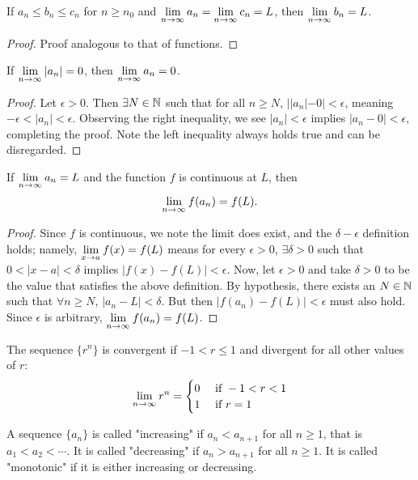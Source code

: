 \documentclass[a4paper,8pt]{article}
\begin{document}
\begin{outline}
    If \(a_n \leq b_n \leq c_n\) for \(n \geq n_0\) and \(\lim\limits_{n\rightarrow \infty^{}}a_n = \lim\limits_{n\rightarrow \infty^{}} c_n = L\), then \(\lim\limits_{n\rightarrow \infty^{}}b_n = L\).

    \begin{proof}
      Proof analogous to that of functions.
    \end{proof}

    If \(\lim\limits_{n\rightarrow \infty^{}}|a_n| = 0\), then \(\lim\limits_{n\rightarrow \infty^{}} a_n = 0\).

    \begin{proof}
      Let \(\epsilon > 0\). Then \(\exists N \in \mathbb{N}\) such that for all \(n \geq N\), \(||a_n|-0| < \epsilon\), meaning \(-\epsilon < |a_n| < \epsilon\).
      Observing the right inequality, we see \(|a_n| < \epsilon\) implies \(|a_n-0| < \epsilon\), completing the proof. Note the left inequality always
      holds true and can be disregarded.
    \end{proof}

    If \(\lim\limits_{n\rightarrow \infty^{}} a_n = L\) and the function \(f\) is continuous at \(L\), then \[ \lim\limits_{n\rightarrow \infty^{}} f(a_n) = f(L)\text{.} \]

    \begin{proof}
      Since \(f\) is continuous, we note the limit does exist, and the \(\delta-\epsilon\) definition holds; namely, \(\lim\limits_{x\rightarrow a^{}} f(x) = f(L)\)
      means for every \(\epsilon > 0\), \(\exists \delta > 0\) such that \(0 < |x - a| < \delta\) implies \(|f(x)-f(L)| < \epsilon\). Now, let
      \(\epsilon > 0\) and take \(\delta > 0\) to be the value that satisfies the above definition. By hypothesis, there exists an \(N \in \mathbb{N}\) such
      that \(\forall n \geq N\), \(|a_n - L| < \delta\). But then \(|f(a_n) - f(L)| < \epsilon\) must also hold. Since \(\epsilon\) is arbitrary,
      \(\lim\limits_{n\rightarrow \infty^{}} f(a_n) = f(L)\).
    \end{proof}

    The sequence \(\{r^n\}\) is convergent if \(-1 < r \leq 1\) and divergent for all other values of \(r\):
    \[
      \lim\limits_{n\rightarrow \infty^{}} r^n = \begin{cases}
          0 &\text{ if } -1 < r < 1 \\
          1 &\text{ if } r = 1
        \end{cases}
    \]

    A sequence \(\{a_n\}\) is called "increasing" if \(a_n < a_{n+1}\) for all \(n \geq 1\), that is \(a_1 < a_2 < \cdots\). It is called "decreasing"
    if \(a_n > a_{n+1}\) for all \(n \geq 1\). It is called "monotonic" if it is either increasing or decreasing.


\end{outline}
\end{document}
